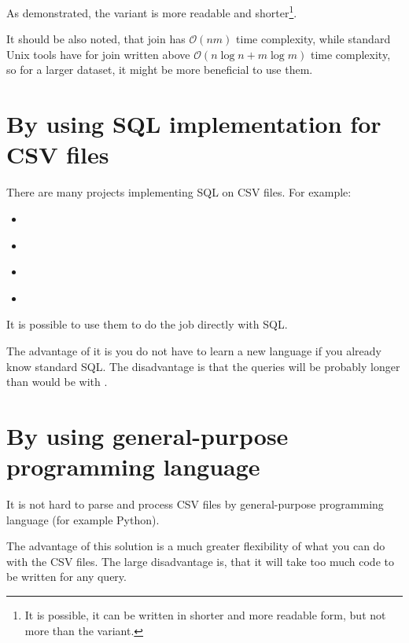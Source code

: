 As demonstrated, the  variant is 
more readable and shorter\footnote{It is possible, it can be written in shorter and more readable form, but not more than the  variant.}.

It should be also noted, that  join has $\mathcal{O}(nm)$ time complexity, while standard Unix tools have for join written above
$\mathcal{O}(n\log n + m\log m)$ time complexity, so for a larger dataset, it might be more beneficial to use them.

\section{By using SQL implementation for CSV files}
There are many projects implementing SQL on CSV files. For example:
\begin{itemize}
    \item {} \cite{q}
    \item {} \cite{csv-sql} 
    \item {} \cite{trdsql}
    \item {} \cite{csvq}
\end{itemize}

It is possible to use them to do the job directly with SQL. 

The advantage of it is you do not have to learn a new language if you already know standard SQL. 
The disadvantage is that the queries will be probably longer than would be with .

\section{By using general-purpose programming language}
It is not hard to parse and process CSV files by general-purpose programming language (for example Python).

The advantage of this solution is a much greater flexibility of what you can do with the CSV files.
The large disadvantage is, that it will take too much code to be written for any query.

